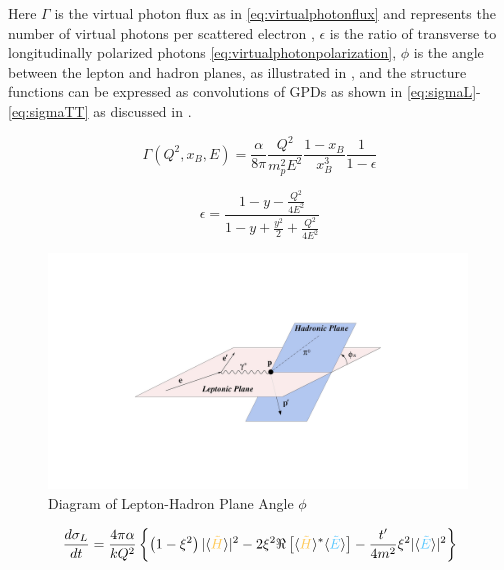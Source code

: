              Here $\Gamma$ is the virtual photon flux as in \eqref{eq:virtualphotonflux} and represents the number of virtual photons per scattered electron \parencite{Amaldi1979Pion-electroproduction}, $\epsilon$ is the ratio of transverse to longitudinally polarized photons \eqref{eq:virtualphotonpolarization}, $\phi$ is the angle between the lepton and hadron planes, as illustrated in , and the structure functions can be expressed as convolutions of GPDs as shown in \eqref{eq:sigmaL}-\eqref{eq:sigmaTT} as discussed in \parencite{Bedlinskiy2014ExclusiveCLAS}. 
  
    
            \begin{equation}\label{eq:virtualphotonflux}
                         \Gamma (Q^2, x_B, E) = \frac{\alpha}{8\pi} \frac{Q^2}{m^2_pE^2}\frac{1-x_B}{x_B^3}\frac{1}{1-\epsilon}
            \end{equation}
        
            \begin{equation}\label{eq:virtualphotonpolarization}
                \epsilon = \frac{1 - y - \frac{Q^2}{4E^2}}{1 - y + \frac{y^2}{2} + \frac{Q^2}{4E^2}}
            \end{equation}\label{Virtual Photon Polarization}

            \begin{figure}[H]
                \centering
                \includegraphics[width=0.99\textwidth]{Chapters/Ch1-Intro/Ch1-Sec2-GPDs-DVMP/pics/lept_had_planes.png}
                \caption{Diagram of Lepton-Hadron Plane Angle $\phi$}
                \label{fig:phi_trento}
            \end{figure}
    
        
         \begin{equation}\label{eq:sigmaL}
                 \textcolor{sigmaL}{\frac{d\sigma_{L}}{dt}} = 
                \frac{4\pi\alpha}{kQ^2}\left\{ \left( 1 - \xi^2 \right) 
                \lvert \langle \GPDHtildeEQ \rangle \rvert ^2 
                -2\xi^2 \Re \left[  \langle \GPDHtildeEQ \rangle ^* \langle \GPDEtildeEQ \rangle    \right] - \frac{t'}{4m^2}\xi^2
                \lvert \langle \GPDEtildeEQ \rangle \rvert ^2  \right\}
            \end{equation} 
        
